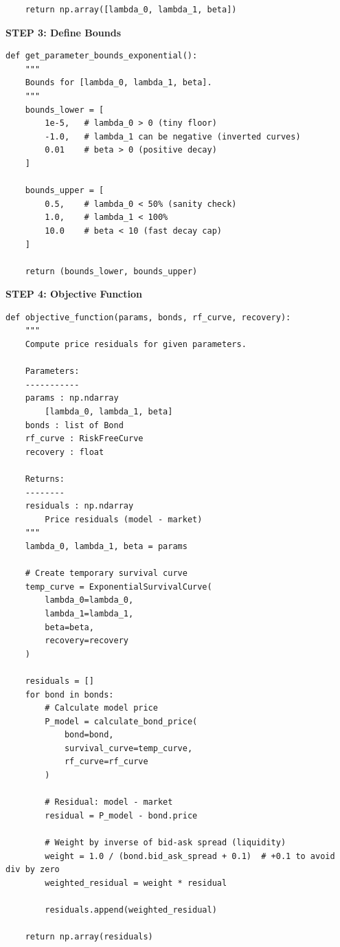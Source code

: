 \documentclass[11pt,a4paper]{article}
\begin{document}
\begin{implbox}
\begin{lstlisting}
    return np.array([lambda_0, lambda_1, beta])
\end{lstlisting}

\textbf{STEP 3: Define Bounds}

\begin{lstlisting}
def get_parameter_bounds_exponential():
    """
    Bounds for [lambda_0, lambda_1, beta].
    """
    bounds_lower = [
        1e-5,   # lambda_0 > 0 (tiny floor)
        -1.0,   # lambda_1 can be negative (inverted curves)
        0.01    # beta > 0 (positive decay)
    ]
    
    bounds_upper = [
        0.5,    # lambda_0 < 50% (sanity check)
        1.0,    # lambda_1 < 100%
        10.0    # beta < 10 (fast decay cap)
    ]
    
    return (bounds_lower, bounds_upper)
\end{lstlisting}

\textbf{STEP 4: Objective Function}

\begin{lstlisting}
def objective_function(params, bonds, rf_curve, recovery):
    """
    Compute price residuals for given parameters.
    
    Parameters:
    -----------
    params : np.ndarray
        [lambda_0, lambda_1, beta]
    bonds : list of Bond
    rf_curve : RiskFreeCurve
    recovery : float
    
    Returns:
    --------
    residuals : np.ndarray
        Price residuals (model - market)
    """
    lambda_0, lambda_1, beta = params
    
    # Create temporary survival curve
    temp_curve = ExponentialSurvivalCurve(
        lambda_0=lambda_0,
        lambda_1=lambda_1,
        beta=beta,
        recovery=recovery
    )
    
    residuals = []
    for bond in bonds:
        # Calculate model price
        P_model = calculate_bond_price(
            bond=bond,
            survival_curve=temp_curve,
            rf_curve=rf_curve
        )
        
        # Residual: model - market
        residual = P_model - bond.price
        
        # Weight by inverse of bid-ask spread (liquidity)
        weight = 1.0 / (bond.bid_ask_spread + 0.1)  # +0.1 to avoid div by zero
        weighted_residual = weight * residual
        
        residuals.append(weighted_residual)
    
    return np.array(residuals)
\end{lstlisting}


\end{implbox}
\end{document}
